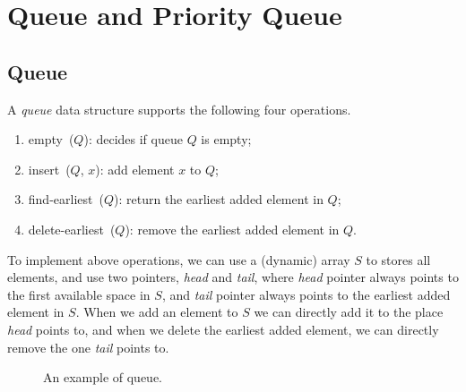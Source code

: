 \setcounter{definition}{0} \setcounter{property}{0} \setcounter{claim}{0} \setcounter{fact}{0} \setcounter{corollary}{0} \setcounter{figure}{0}
\section{Queue and Priority Queue}

\subsection*{Queue}

A \emph{queue} data structure supports the following four operations.
\vspace*{-\topsep}
\begin{enumerate}
\item empty~($Q$): decides if queue $Q$ is empty;
\item insert~($Q$, $x$): add element $x$ to $Q$;
\item find-earliest~($Q$): return the earliest added element in $Q$;
\item delete-earliest~($Q$): remove the earliest added element in $Q$.
\end{enumerate}

To implement above operations, we can use a (dynamic) array $S$ to stores all elements,
and use two pointers, \emph{head} and \emph{tail}, where \emph{head} pointer always points
to the first available space in $S$, and \emph{tail} pointer always points to the 
earliest added element in $S$. When we add an element to $S$ we can directly
add it to the place \emph{head} points to, and when we delete the earliest added
element, we can directly remove the one \emph{tail} points to.

\begin{figure}[h!]
\centering{}
\caption{An example of queue.}
\end{figure}

\begin{minipage}{0.8\textwidth}
	\xxx
	\xxx
	\xxx
	\xxx
\end{minipage}

\begin{minipage}{0.8\textwidth}
	\xxx
	\xxx
	\xxx
	\xxx
\end{minipage}

